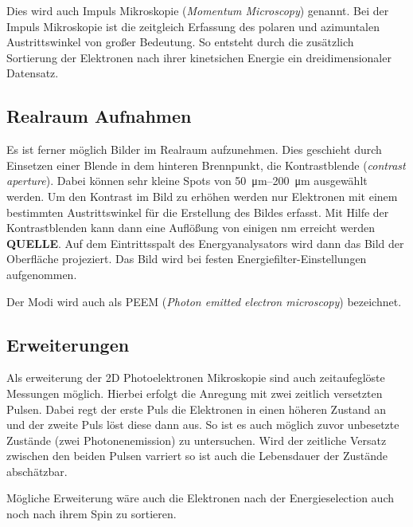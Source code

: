             Dies wird auch Impuls Mikroskopie (\textit{Momentum Microscopy}) genannt.
            Bei der Impuls Mikroskopie ist die zeitgleich Erfassung des polaren und azimuntalen Austrittswinkel von großer Bedeutung. 
            So entsteht durch die zusätzlich Sortierung der Elektronen nach ihrer kinetsichen Energie ein dreidimensionaler Datensatz.

        \subsection{Realraum Aufnahmen}
            Es ist ferner möglich Bilder im Realraum aufzunehmen.
            Dies geschieht durch Einsetzen einer Blende in dem hinteren Brennpunkt, die Kontrastblende (\textit{contrast aperture}).
            Dabei können sehr kleine Spots von \SIrange{50}{200}{\micro\meter} ausgewählt werden.
            Um den Kontrast im Bild zu erhöhen werden nur Elektronen mit einem bestimmten Austrittswinkel für die Erstellung des Bildes erfasst.
            Mit Hilfe der Kontrastblenden kann dann eine Auflößung von einigen \si{\nano\meter} erreicht werden \textbf{QUELLE}. 
            Auf dem Eintrittsspalt des Energyanalysators wird dann das Bild der Oberfläche projeziert.
            Das Bild wird bei festen Energiefilter-Einstellungen aufgenommen.

            Der Modi wird auch als PEEM (\textit{Photon emitted electron microscopy}) bezeichnet.

           
        
        \subsection{Erweiterungen}
            Als erweiterung der 2D Photoelektronen Mikroskopie sind auch zeitaufeglöste Messungen möglich.
            Hierbei erfolgt die Anregung mit zwei zeitlich versetzten Pulsen. 
            Dabei regt der erste Puls die Elektronen in einen höheren Zustand an und der zweite Puls löst diese dann aus.
            So ist es auch möglich zuvor unbesetzte Zustände (zwei Photonenemission) zu untersuchen.
            Wird der zeitliche Versatz zwischen den beiden Pulsen varriert so ist auch die Lebensdauer der Zustände abschätzbar.

            Mögliche Erweiterung wäre auch die Elektronen nach der Energieselection auch noch nach ihrem Spin zu sortieren.
        

